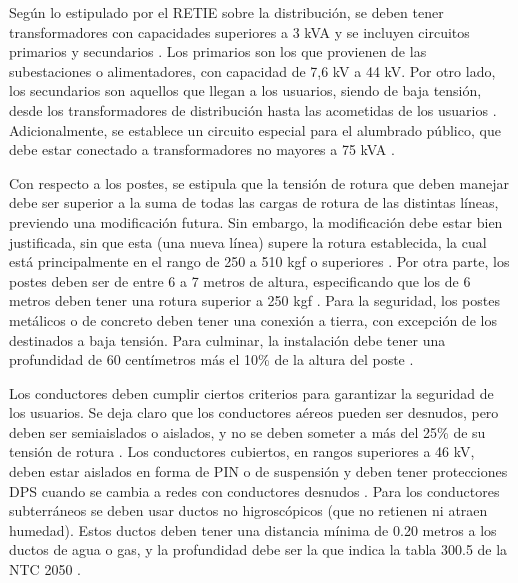 Según lo estipulado por el RETIE sobre la distribución, se deben tener transformadores con capacidades superiores a 3 kVA y se incluyen circuitos primarios y secundarios \cite{retie_2013}. Los primarios son los que provienen de las subestaciones o alimentadores, con capacidad de 7,6 kV a 44 kV. Por otro lado, los secundarios son aquellos que llegan a los usuarios, siendo de baja tensión, desde los transformadores de distribución hasta las acometidas de los usuarios \cite{retie_2013}. Adicionalmente, se establece un circuito especial para el alumbrado público, que debe estar conectado a transformadores no mayores a 75 kVA \cite{retie_2013}.

Con respecto a los postes, se estipula que la tensión de rotura que deben manejar debe ser superior a la suma de todas las cargas de rotura de las distintas líneas, previendo una modificación futura. Sin embargo, la modificación debe estar bien justificada, sin que esta (una nueva línea) supere la rotura establecida, la cual está principalmente en el rango de 250 a 510 kgf o superiores \cite{retie_2013}. Por otra parte, los postes deben ser de entre 6 a 7 metros de altura, especificando que los de 6 metros deben tener una rotura superior a 250 kgf \cite{retie_2013}. Para la seguridad, los postes metálicos o de concreto deben tener una conexión a tierra, con excepción de los destinados a baja tensión. Para culminar, la instalación debe tener una profundidad de 60 centímetros más el 10\% de la altura del poste \cite{retie_2013}.

Los conductores deben cumplir ciertos criterios para garantizar la seguridad de los usuarios. Se deja claro que los conductores aéreos pueden ser desnudos, pero deben ser semiaislados o aislados, y no se deben someter a más del 25\% de su tensión de rotura \cite{retie_2013}. Los conductores cubiertos, en rangos superiores a 46 kV, deben estar aislados en forma de PIN o de suspensión y deben tener protecciones DPS cuando se cambia a redes con conductores desnudos \cite{retie_2013}. Para los conductores subterráneos se deben usar ductos no higroscópicos (que no retienen ni atraen humedad). Estos ductos deben tener una distancia mínima de 0.20 metros a los ductos de agua o gas, y la profundidad debe ser la que indica la tabla 300.5 de la NTC 2050 \cite{ntc2050_1998}.

